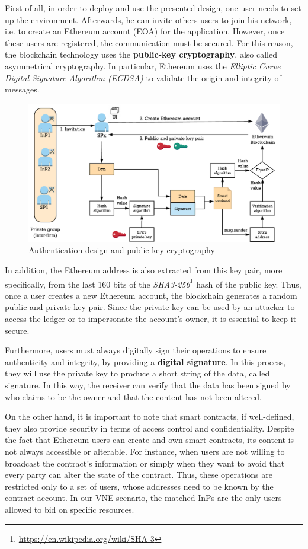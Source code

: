 First of all, in order to deploy and use the presented design, one user needs to set up the environment. Afterwards, he can invite others users to join his network, i.e. to create an Ethereum account (EOA) for the application. However, once these users are registered, the communication must be secured. For this reason, the blockchain technology uses the \textbf{public-key cryptography}, also called asymmetrical cryptography. In particular, Ethereum uses the \textit{Elliptic Curve Digital Signature Algorithm (ECDSA)} to validate the origin and integrity of messages. 

\begin{figure}[bth]
	\centering
	\includegraphics[width=0.9\linewidth]{gfx/authentication_design}    
  	\caption{Authentication design and public-key cryptography}
  	\label{fig:authenticationDesign}
\end{figure}

In addition, the Ethereum address is also extracted from this key pair, more specifically, from the last 160 bits of the \textit{SHA3-256}\footnote{\url{https://en.wikipedia.org/wiki/SHA-3}} hash of the public key. Thus, once a user creates a new Ethereum account, the blockchain generates a random public and private key pair. Since the private key can be used by an attacker to access the ledger or to impersonate the account's owner, it is essential to keep it secure.

Furthermore, users must always digitally sign their operations to ensure authenticity and integrity, by providing a \textbf{digital signature}. In this process, they will use the private key to produce a short string of the data, called signature. In this way, the receiver can verify that the data has been signed by who claims to be the owner and that the content has not been altered.

On the other hand, it is important to note that smart contracts, if well-defined, they also provide security in terms of access control and confidentiality. Despite the fact that Ethereum users can create and own smart contracts, its content is not always accessible or alterable. For instance, when users are not willing to broadcast the contract's information or simply when they want to avoid that every party can alter the state of the contract. Thus, these operations are restricted only to a set of users, whose addresses need to be known by the contract account. In our VNE scenario, the matched InPs are the only users allowed to bid on specific resources.

